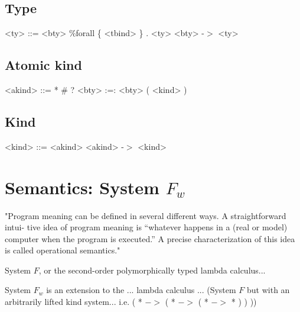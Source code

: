 \subsection{Type}

\begin{grammar}
<ty> ::= <bty>
    \alt \%forall \{ <tbind> \} . <ty>
    \alt <bty> -$>$ <ty>
\end{grammar}

\subsection{Atomic kind}

\begin{grammar}
<akind> ::= *
       \alt \#
       \alt ?
       \alt <bty> :=: <bty>
       \alt ( <kind> )
\end{grammar}

\subsection{Kind}

\begin{grammar}
<kind> ::= <akind>
      \alt <akind> -$>$ <kind>
\end{grammar}




\section{Semantics: System $F_w$}

"Program meaning can be defined in several different ways. A straightforward intui-
tive idea of program meaning is “whatever happens in a (real or model) computer when
the program is executed.” A precise characterization of this idea is called operational
semantics."




System $F$, or the second-order polymorphically typed lambda calculus...

System $F_w$ is an extension to the ... lambda calculus ... 
(System $F$ but with an arbitrarily lifted kind system... i.e. ( * $->$ ( * $->$ ( * $->$ * ) ) ))







\begin{comment}


\section{Translation into the Stg language}



\section{GHC Extensions to Haskell 98}

\subsection{Existensial quantification}

\end{comment}

